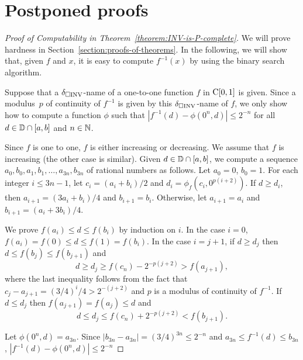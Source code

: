 \documentclass[envcountsame,orivec,oribibl]{llncs}
\begin{document}



\clearpage
\appendix
\section{Postponed proofs}

\begin{proof}[Proof of Computability in Theorem~\ref{theorem:INV-is-P-complete}]
We will prove hardness in Section~\ref{section:proofs-of-theorems}.
In the following, we will show that, 
given $f$ and $x$, 
it is easy to compute $f^{-1}(x)$ by using the binary search algorithm.

Suppose that a $\delta _{\square \mathrm{INV}}$-name of a one-to-one function $f$ in $\mathrm C [0, 1]$ is given. 
Since a modulus~$p$ of continuity of $f ^{-1}$ is given by this $\delta _{\square \mathrm{INV}}$-name of $f$,
we only show how to compute a function $\phi$ such that 
$|f^{-1}(d) - \phi(0^n, d)| \le 2^{-n}$ for all $d \in \mathbb D \cap [a, b]$ and $n \in \mathbb N$.

Since $f$ is one to one, $f$ is either increasing or decreasing. 
We assume that $f$ is increasing (the other case is similar).
Given $d \in \mathbb D \cap [a, b]$, 
we compute a sequence  $a_0, b_0, a_1,b_1, \dots, a_{3n}, b_{3n}$ of rational numbers as follows.
Let $a_0 = 0$, $b_0 = 1$.
For each integer $i \le 3n-1$,
let $c_i = (a_i+b_i)/2$ and $d_i = \phi_f(c_i, 0^{p(i+2)})$.
If $d \ge d_i$, then $a_{i+1} = (3a_i+b_i)/4$ and $b_{i+1} = b_i$. 
Otherwise, let $a_{i+1} = a_i$ and $b_{i+1} = (a_i+3b_i)/4$.

We prove $f(a_i) \leq d \leq f(b_i)$ by induction on $i$.
In the case $i = 0$, $f(a_i) = f(0) \le d \le f(1) = f(b_i)$.
In the case $i=j+1$, if $d \ge d_j$ then $d \le f(b_j) \le f(b_{j+1})$ and
\begin{equation}
 d \ge d_j \ge f(c_n) - 2^{-p(j+2)} > f(a_{j+1}),
\end{equation}
where the last inequality follows from the fact that $c_j - a_{j+1} = (3/4)^i/4 > 2^{-(j+2)}$ and $p$ is a modulus of continuity of $f^{-1}$.
If $d \le d_j$ then $f(a_{j+1}) = f(a_j) \le d$ and 
\begin{equation}
 d \le d_j \le f(c_n) + 2^{-p(j+2)} < f(b_{j+1}).
\end{equation}

Let $\phi(0^n, d) = a_{3n}$.
Since $|b_{3n} - a_{3n}| = (3/4)^{3n} \le 2^{-n}$ and
$a_{3n} \le f^{-1}(d) \le b_{3n}$,
$|f^{-1}(d) - \phi(0^n, d)| \le 2^{-n}$
\end{proof}
\end{document}
